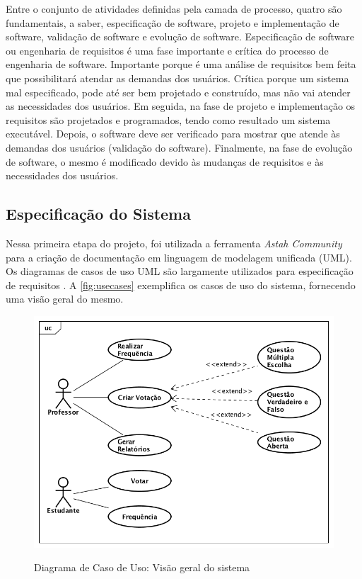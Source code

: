 Entre o conjunto de atividades definidas pela camada de processo, quatro são
fundamentais, a saber, especificação de software, projeto e implementação de
software, validação de software e evolução de software. Especificação de software
ou engenharia de requisitos é uma fase importante e crítica do processo de engenharia
de software. Importante porque é uma análise de requisitos bem feita que possibilitará
atendar as demandas dos usuários. Crítica porque um sistema mal especificado, pode até ser
bem projetado e construído, mas não vai atender as necessidades dos usuários.
Em seguida, na fase de projeto e implementação os requisitos são projetados e programados,
tendo como resultado um sistema executável. Depois, o software deve ser verificado
para mostrar que atende às demandas dos usuários (validação do software). Finalmente,
na fase de evolução de software, o mesmo é modificado devido às mudanças
de requisitos e às necessidades dos usuários.

\subsection{Especificação do Sistema}
Nessa primeira etapa do projeto, foi utilizada a ferramenta \textit{Astah Community} \cite{astah2016}
para a criação de documentação em linguagem de modelagem unificada (UML). Os diagramas
de casos de uso UML são largamente utilizados para especificação de requisitos \cite{Sommerville2006}.
A \autoref{fig:usecases} exemplifica os casos de uso do sistema, fornecendo uma
visão geral do mesmo.

\begin{figure}[!htb]
  \centering
  \caption{Diagrama de Caso de Uso: Visão geral do sistema}
  \includegraphics[width=.75\textwidth]{imagens/casodeuso}
  \label{fig:usecases}
\end{figure}

